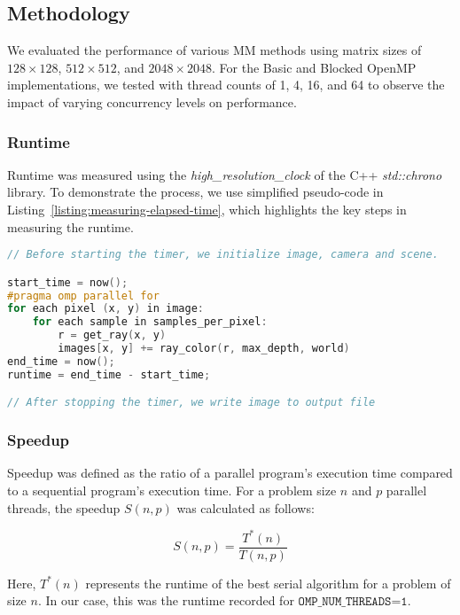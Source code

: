 \subsection{Methodology}
\label{subsec:methodology}



We evaluated the performance of various MM methods using matrix sizes of \(128 \times 128\), \(512 \times 512\), and \(2048 \times 2048\). For the Basic and Blocked OpenMP implementations, we tested with thread counts of 1, 4, 16, and 64 to observe the impact of varying concurrency levels on performance.

\subsubsection{Runtime}
\label{subsubsec:runtime}
Runtime was measured using the \textit{high\_resolution\_clock} of the C++ \textit{std::chrono} library. To demonstrate the process, we use simplified pseudo-code in Listing~\ref{listing:measuring-elapsed-time}, which highlights the key steps in measuring the runtime.

\begin{lstlisting}[caption={Simplified pseudo-code for measuring the runtime of ray tracing.},label={listing:measuring-elapsed-time},name=measuring-elapsed-time,float=htbp,style=mystyle,language=C++]
// Before starting the timer, we initialize image, camera and scene.

start_time = now();
#pragma omp parallel for
for each pixel (x, y) in image:
    for each sample in samples_per_pixel:
        r = get_ray(x, y)
        images[x, y] += ray_color(r, max_depth, world)
end_time = now();
runtime = end_time - start_time;

// After stopping the timer, we write image to output file
\end{lstlisting}

\subsubsection{Speedup}
\label{subsubsec:speedup}
Speedup was defined as the ratio of a parallel program's execution time compared to a sequential program's execution time. For a problem size \(n\) and \(p\) parallel threads, the speedup \(S(n, p)\) was calculated as follows:

\begin{displaymath}
    S(n, p) = \frac{T^*(n)}{T(n, p)}
\end{displaymath}

Here, \(T^*(n)\) represents the runtime of the best serial algorithm for a problem of size \(n\). In our case, this was the runtime recorded for \(\texttt{OMP\_NUM\_THREADS=1}\).